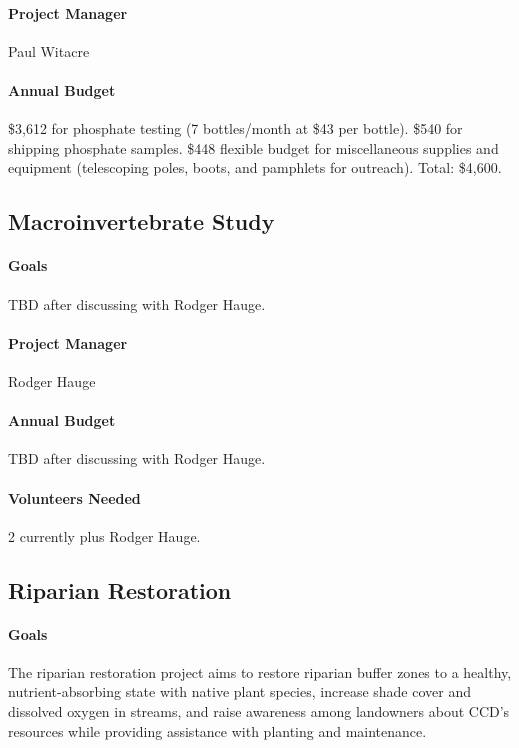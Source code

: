 \documentclass[letterpaper,11pt,leqno]{article}
\begin{document}
\paragraph{Project Manager} Paul Witacre
\paragraph{Annual Budget} \$3,612 for phosphate testing (7 bottles/month at \$43 per bottle). \$540 for shipping phosphate samples. \$448 flexible budget
for miscellaneous supplies and equipment (telescoping poles, boots, and pamphlets for outreach). Total: \$4,600.


\subsection{Macroinvertebrate Study}
\paragraph{Goals} TBD after discussing with Rodger Hauge.
\paragraph{Project Manager} Rodger Hauge
\paragraph{Annual Budget} TBD after discussing with Rodger Hauge.
\paragraph{Volunteers Needed} 2 currently plus Rodger Hauge.


\subsection{Riparian Restoration}

\paragraph{Goals}
The riparian restoration project aims to restore riparian buffer zones to a healthy, nutrient-absorbing state with native plant species, increase shade cover and dissolved oxygen in streams, and raise awareness among landowners about CCD's resources while providing assistance with planting and maintenance.
\end{document}
